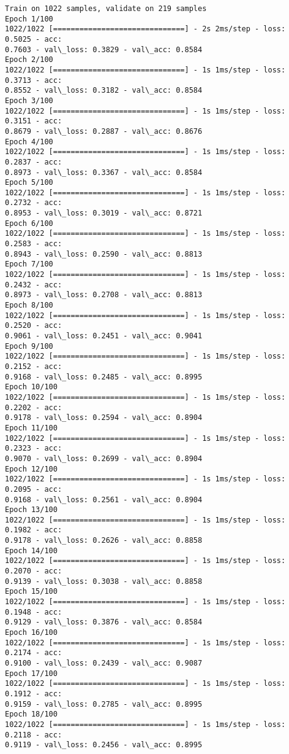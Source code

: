 \documentclass[11pt]{article}
\begin{document}
    \begin{Verbatim}[commandchars=\\\{\}]
Train on 1022 samples, validate on 219 samples
Epoch 1/100
1022/1022 [==============================] - 2s 2ms/step - loss: 0.5025 - acc:
0.7603 - val\_loss: 0.3829 - val\_acc: 0.8584
Epoch 2/100
1022/1022 [==============================] - 1s 1ms/step - loss: 0.3713 - acc:
0.8552 - val\_loss: 0.3182 - val\_acc: 0.8584
Epoch 3/100
1022/1022 [==============================] - 1s 1ms/step - loss: 0.3151 - acc:
0.8679 - val\_loss: 0.2887 - val\_acc: 0.8676
Epoch 4/100
1022/1022 [==============================] - 1s 1ms/step - loss: 0.2837 - acc:
0.8973 - val\_loss: 0.3367 - val\_acc: 0.8584
Epoch 5/100
1022/1022 [==============================] - 1s 1ms/step - loss: 0.2732 - acc:
0.8953 - val\_loss: 0.3019 - val\_acc: 0.8721
Epoch 6/100
1022/1022 [==============================] - 1s 1ms/step - loss: 0.2583 - acc:
0.8943 - val\_loss: 0.2590 - val\_acc: 0.8813
Epoch 7/100
1022/1022 [==============================] - 1s 1ms/step - loss: 0.2432 - acc:
0.8973 - val\_loss: 0.2708 - val\_acc: 0.8813
Epoch 8/100
1022/1022 [==============================] - 1s 1ms/step - loss: 0.2520 - acc:
0.9061 - val\_loss: 0.2451 - val\_acc: 0.9041
Epoch 9/100
1022/1022 [==============================] - 1s 1ms/step - loss: 0.2152 - acc:
0.9168 - val\_loss: 0.2485 - val\_acc: 0.8995
Epoch 10/100
1022/1022 [==============================] - 1s 1ms/step - loss: 0.2202 - acc:
0.9178 - val\_loss: 0.2594 - val\_acc: 0.8904
Epoch 11/100
1022/1022 [==============================] - 1s 1ms/step - loss: 0.2323 - acc:
0.9070 - val\_loss: 0.2699 - val\_acc: 0.8904
Epoch 12/100
1022/1022 [==============================] - 1s 1ms/step - loss: 0.2095 - acc:
0.9168 - val\_loss: 0.2561 - val\_acc: 0.8904
Epoch 13/100
1022/1022 [==============================] - 1s 1ms/step - loss: 0.1982 - acc:
0.9178 - val\_loss: 0.2626 - val\_acc: 0.8858
Epoch 14/100
1022/1022 [==============================] - 1s 1ms/step - loss: 0.2070 - acc:
0.9139 - val\_loss: 0.3038 - val\_acc: 0.8858
Epoch 15/100
1022/1022 [==============================] - 1s 1ms/step - loss: 0.1948 - acc:
0.9129 - val\_loss: 0.3876 - val\_acc: 0.8584
Epoch 16/100
1022/1022 [==============================] - 1s 1ms/step - loss: 0.2174 - acc:
0.9100 - val\_loss: 0.2439 - val\_acc: 0.9087
Epoch 17/100
1022/1022 [==============================] - 1s 1ms/step - loss: 0.1912 - acc:
0.9159 - val\_loss: 0.2785 - val\_acc: 0.8995
Epoch 18/100
1022/1022 [==============================] - 1s 1ms/step - loss: 0.2118 - acc:
0.9119 - val\_loss: 0.2456 - val\_acc: 0.8995

\end{Verbatim}
\end{document}
